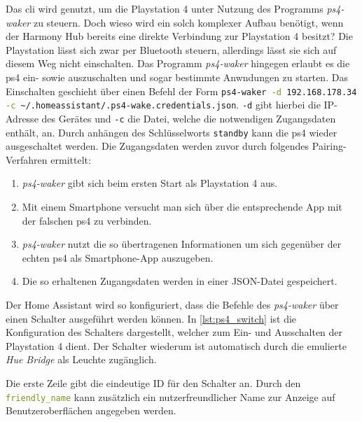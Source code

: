 Das \ac{cli} wird genutzt, um die Playstation 4 unter Nutzung des Programms \textit{ps4-waker}\cite{dhleongp12:online} zu steuern.
Doch wieso wird ein solch komplexer Aufbau benötigt, wenn der Harmony Hub bereits eine direkte Verbindung zur Playstation 4 besitzt?
Die Playstation lässt sich zwar per Bluetooth steuern, allerdings lässt sie sich auf diesem Weg nicht einschalten.
Das Programm \textit{ps4-waker} hingegen erlaubt es die \ac{ps4} ein- sowie auszuschalten und sogar bestimmte Anwndungen zu starten.
Das Einschalten geschieht über einen Befehl der Form \lstinline[language=bash]{ps4-waker -d 192.168.178.34  -c ~/.homeassistant/.ps4-wake.credentials.json}.
\lstinline[language=bash]{-d} gibt hierbei die IP-Adresse des Gerätes und
\lstinline[language=bash]{-c} die Datei,
welche die notwendigen Zugangsdaten enthält, an.
Durch anhängen des Schlüsselworts \lstinline[language=bash]{standby} kann die
\ac{ps4} wieder ausgeschaltet werden.
Die Zugangsdaten werden zuvor durch folgendes Pairing-Verfahren ermittelt:
\begin{enumerate}
    \setlength\itemsep{-0.5em}
    \item \textit{ps4-waker} gibt sich beim ersten Start als Playstation 4 aus.
    \item Mit einem Smartphone versucht man sich über die entsprechende App mit der falschen \ac{ps4} zu verbinden.
    \item \textit{ps4-waker} nutzt die so übertragenen Informationen um sich gegenüber der echten \ac{ps4} als Smartphone-App auszugeben.
    \item Die so erhaltenen Zugangsdaten werden in einer JSON-Datei gespeichert.
\end{enumerate}

Der Home Assistant wird so konfiguriert,
dass die Befehle des \textit{ps4-waker} über einen Schalter ausgeführt werden können.
In \autoref{lst:ps4_switch} ist die Konfiguration des Schalters dargestellt,
welcher zum Ein- und Ausschalten der Playstation 4 dient.
Der Schalter wiederum ist automatisch durch die emulierte \textit{Hue Bridge} als Leuchte zugänglich.



Die erste Zeile gibt die eindeutige ID für den Schalter an.
Durch den \lstinline[language=yaml]{friendly_name} kann zusätzlich ein nutzerfreundlicher Name zur Anzeige auf Benutzeroberflächen angegeben werden.

